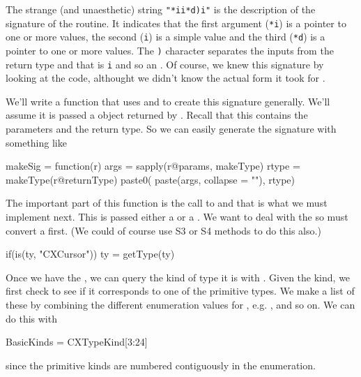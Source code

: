 The strange (and unaesthetic) string \verb+"*ii*d)i"+ is the
description of the signature of the routine.  It indicates that the
first argument (\verb+*i+) is a pointer to one or more 
values, the second (\verb+i+) is a simple  value and the
third (\verb+*d+) is a pointer to one or more  values.
The \verb+)+ character separates the inputs from the return type and
that is \verb+i+ and so an .  Of course, we knew this
signature by looking at the code, althought we didn't know the actual
form it took for .

We'll write a function that uses \libclang{} and  to
create this signature generally.  We'll assume it is passed a
 object returned by .
Recall that this contains the parameters and the return type.
So we can easily generate the signature with something like
\begin{RCode}
makeSig = 
function(r)
{
   args = sapply(r@params, makeType)
   rtype = makeType(r@returnType)
   paste0( paste(args, collapse = ""), rtype)
}
\end{RCode}
The important part of this function is the call to 
and that is what we must implement next.
This is passed  either a  or a .
We want to deal with the  so must convert a
 first. (We could of course use S3 or S4 methods to
do this also.)
\begin{RCode}
   if(is(ty, "CXCursor"))
     ty = getType(ty)
\end{RCode}
Once we have the , we can query the kind of type it is
with .
Given the kind, we first check to see if it corresponds to one of the
primitive types. We make a list of these by combining
the different enumeration values for , e.g. 
,  and so on.
We can do this with
\begin{RCode}
BasicKinds = CXTypeKind[3:24]
\end{RCode}
since the primitive kinds are numbered contiguously in the
enumeration.

